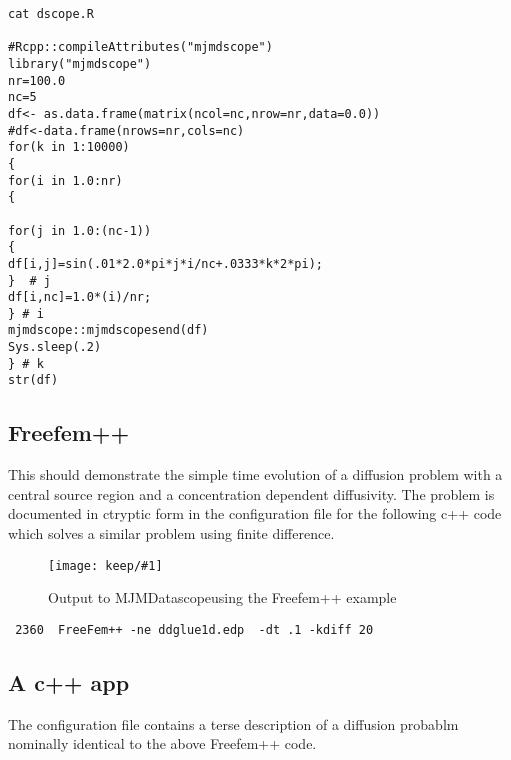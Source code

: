 \documentclass[aps,secnumarabic,balancelastpage,amsmath,amssymb,nofootinbib]{revtex4}
\newcommand{\mjmprod}{MJMDatascope}
\newcommand{\mjmpicture}[3]
{
\begin{figure}[H]
{ \texttt{[image: keep/\#1]} }
\caption{#2}
\label{fig:#3}
\end{figure}
} %
\begin{document}
\begin{lstlisting}
cat dscope.R 

#Rcpp::compileAttributes("mjmdscope")
library("mjmdscope")
nr=100.0
nc=5
df<- as.data.frame(matrix(ncol=nc,nrow=nr,data=0.0))
#df<-data.frame(nrows=nr,cols=nc)
for(k in 1:10000)
{
for(i in 1.0:nr)
{

for(j in 1.0:(nc-1))
{
df[i,j]=sin(.01*2.0*pi*j*i/nc+.0333*k*2*pi);
}  # j
df[i,nc]=1.0*(i)/nr;
} # i 
mjmdscope::mjmdscopesend(df)
Sys.sleep(.2)
} # k 
str(df)
\end{lstlisting}




\subsection{ Freefem++ }

This should demonstrate the simple time evolution of
a diffusion problem with a central source region
and a concentration dependent diffusivity. 
The problem is documented in ctryptic form in 
the configuration file for the following c++
code which solves a similar problem using finite difference. 

\mjmpicture{ffdscope.jpeg}{Output to \mjmprod using the Freefem++  example}{ffdscope}

\begin{lstlisting}
 2360  FreeFem++ -ne ddglue1d.edp  -dt .1 -kdiff 20
\end{lstlisting}


\subsection{ A c++ app }
The configuration file contains a terse description
of a diffusion probablm nominally identical to the 
above Freefem++ code. 
\end{document}
